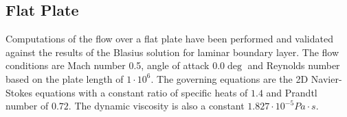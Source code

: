 \graphicspath{{figures_flatplate/}}%

\subsection{Flat Plate}


Computations of the flow over a flat plate have been performed and validated against the results of the Blasius solution for laminar boundary layer. The flow conditions are Mach number 0.5, angle of attack $0.0\deg$ and Reynolds number based on the plate length of $1\cdot10^6$. The governing equations are the 2D Navier-Stokes equations with a constant ratio of specific heats of $1.4$ and Prandtl number of $0.72$. The dynamic viscosity is also a constant $1.827\cdot 10^{-5} Pa \cdot s$.

